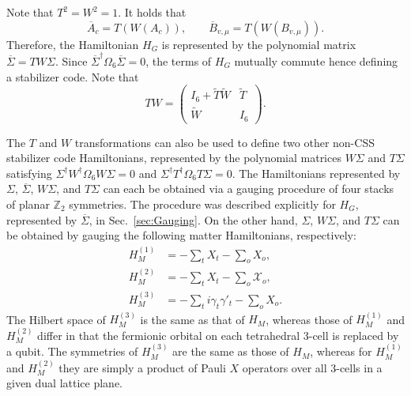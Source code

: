 \documentclass[prx,twocolumn,superscriptaddress,nofootinbib,showpacs,notitlepage]{revtex4-2}
\begin{document}
Note that $T^2=W^2=1$. It holds that
\begin{equation}
    \overline{A}_c=T(W(A_c)),\qquad\overline{B}_{v,\mu}=T(W(B_{v,\mu})).
\end{equation}
Therefore, the Hamiltonian $H_G$ is represented by the polynomial matrix $\overline{\Sigma}=TW\Sigma$. Since $\overline{\Sigma}^\dagger\Omega_6\overline{\Sigma}=0$, the terms of $H_G$ mutually commute hence defining a stabilizer code. Note that
\begin{equation}
    TW=\begin{pmatrix}
    I_6+\tilde{T}\tilde{W}&\tilde{T}\\\tilde{W}&I_6
    \end{pmatrix}.
\end{equation}

The $T$ and $W$ transformations can also be used to define two other non-CSS stabilizer code Hamiltonians, represented by the polynomial matrices $W\Sigma$ and $T\Sigma$ satisfying $\Sigma^\dagger W^\dagger\Omega_6W\Sigma=0$ and $\Sigma^\dagger T^\dagger\Omega_6T\Sigma=0$. The Hamiltonians represented by $\Sigma$, $\overline{\Sigma}$, $W\Sigma$, and $T\Sigma$ can each be obtained via a gauging procedure of four stacks of planar $\mathbb{Z}_2$ symmetries. The procedure was described explicitly for $H_G$, represented by $\overline{\Sigma}$, in Sec.~\ref{sec:Gauging}. On the other hand, $\Sigma$, $W\Sigma$, and $T\Sigma$ can be obtained by gauging the following matter Hamiltonians, respectively:
\begin{align}
    H_M^{(1)}&=-\sum_tX_t-\sum_oX_o,\\
    H_M^{(2)}&=-\sum_tX_t-\sum_o\mathcal{X}_o,\\
    H_M^{(3)}&=-\sum_ti\gamma_t\gamma'_t-\sum_oX_o.
\end{align}
The Hilbert space of $H_M^{(3)}$ is the same as that of $H_M$, whereas those of $H_M^{(1)}$ and $H_M^{(2)}$ differ in that the fermionic orbital on each tetrahedral 3-cell is replaced by a qubit. The symmetries of $H_M^{(3)}$ are the same as those of $H_M$, whereas for $H_M^{(1)}$ and $H_M^{(2)}$ they are simply a product of Pauli $X$ operators over all 3-cells in a given dual lattice plane.
\end{document}
